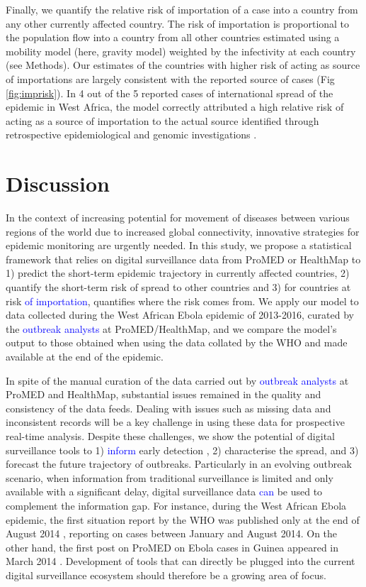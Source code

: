 \documentclass[9pt,twocolumn,twoside,lineno]{pnas-new}
\newcommand{\sangeeta}[1]{\textcolor{blue}{#1}}
\begin{document}
Finally, we quantify the relative risk of importation of a case into a
country from any other currently affected country. The risk of
importation is proportional to the population flow into a country from
all other countries estimated using a mobility model (here, gravity
model) weighted by the infectivity at each country (see Methods). Our
estimates of the countries with higher risk of acting as source of
importations are largely consistent with the reported source of cases
(Fig \ref{fig:imprisk}). In 4 out of the 5 reported cases of international spread
of the epidemic in West Africa, the model correctly attributed a high relative
risk of acting as a source of importation to the actual source
identified through retrospective epidemiological and genomic
investigations \cite{gire2014genomic}.

% 

\section*{Discussion}\label{discussion}

In the context of increasing potential for movement of diseases between
various regions of the world due to increased global connectivity,
innovative strategies for epidemic monitoring are urgently needed. In
this study, we propose a statistical framework that relies on digital
surveillance data from ProMED or HealthMap to 1) predict the short-term
epidemic trajectory in currently affected countries, 2) quantify the
short-term risk of spread to other countries and 3) for countries at
risk \sangeeta{of importation}, quantifies where the risk comes from. We apply our model to data
collected during the West African Ebola epidemic of 2013-2016, curated
by the \sangeeta{outbreak analysts} at ProMED/HealthMap, and we compare the model's output
to those obtained when using the data collated by the WHO and made
available at the end of the epidemic.

In spite of the manual curation of the data carried out by
\sangeeta{outbreak analysts} at ProMED and HealthMap, substantial issues remained in
the quality and consistency of the data feeds. Dealing with issues such
as missing data and inconsistent records will be a key challenge in
using these data for prospective real-time analysis. Despite these
challenges, we show the potential of digital surveillance tools to
1) \sangeeta{inform} early detection , 2) characterise the spread, and 3) forecast
the future trajectory of outbreaks. Particularly in an evolving outbreak
scenario, when information from traditional surveillance is limited and
only available with a significant delay, digital surveillance data \sangeeta{can}
be used to complement the information gap. For instance, during the West
African Ebola epidemic, the first situation report by the WHO was
published only at the end of August 2014 \cite{whositrep}, 
reporting on cases between January and August 2014. On the other
hand, the first post on ProMED on Ebola cases in Guinea appeared in
March 2014 \cite{pmfirstebola}. Development of tools that can directly be
plugged into the current digital surveillance ecosystem should therefore
be a growing area of focus.
\end{document}
